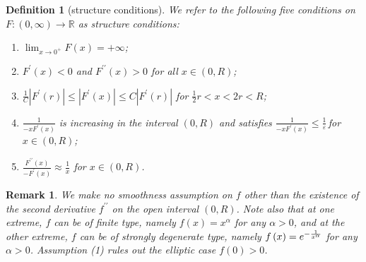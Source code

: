 \documentclass{amsart}
\theoremstyle{plain}
\newtheorem{definition}[theorem]{Definition}
\newtheorem{remark}[theorem]{Remark}
\numberwithin{equation}{section}
\begin{document}
\begin{definition}[structure conditions]
	\label{structure conditions}We refer to the following five conditions on $%
	F:\left( 0,\infty \right) \rightarrow \mathbb{R}$ as \emph{structure
		conditions}:
	
	\begin{enumerate}
		\item $\lim_{x\rightarrow 0^{+}}F\left( x\right) =+\infty $;
		
		\item $F^{\prime }\left( x\right) <0$ and $F^{\prime \prime }\left( x\right)
		>0$ for all $x\in (0,R)$;
		
		\item $\frac{1}{C}\left\vert F^{\prime }\left( r\right) \right\vert \leq
		\left\vert F^{\prime }\left( x\right) \right\vert \leq C\left\vert F^{\prime
		}\left( r\right) \right\vert $ for $\frac{1}{2}r<x<2r<R$;
		
		\item $\frac{1}{-xF^{\prime }\left( x\right) }$ is increasing in the
		interval $\left( 0,R\right) $ and satisfies $\frac{1}{-xF^{\prime }\left(
			x\right) }\leq \frac{1}{\varepsilon }\,$for $x\in (0,R)$;
		
		\item $\frac{F^{\prime \prime }\left( x\right) }{-F^{\prime }\left( x\right) 
		}\approx \frac{1}{x}$ for $x\in (0,R)$.
	\end{enumerate}
\end{definition}

\begin{remark}
	We make no smoothness assumption on $f$ other than the existence of the
	second derivative $f^{\prime \prime }$ on the open interval $(0,R)$. Note
	also that at one extreme, $f$ can be of finite type, namely $f\left(
	x\right) =x^{\alpha }$ for any $\alpha >0$, and at the other extreme, $f$
	can be of strongly degenerate type, namely $f\left( x\right) =e^{-\frac{1}{%
			x^{\alpha }}}$ for any $\alpha >0$. Assumption (1) rules out the elliptic
	case $f\left( 0\right) >0$.
\end{remark}
\end{document}
